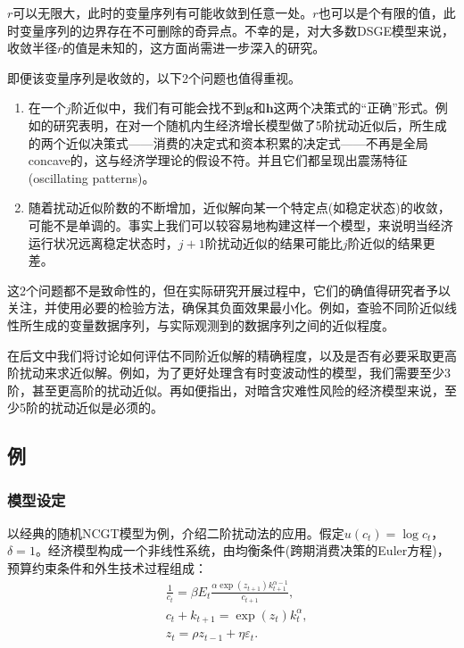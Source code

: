 $r$可以无限大，此时的变量序列有可能收敛到任意一处。$r$也可以是个有限的值，此时变量序列的边界存在不可删除的奇异点。不幸的是，对大多数DSGE模型来说，收敛半径$r$的值是未知的，这方面尚需进一步深入的研究\citep{Swanson:2006gy, Aldrich:2011wz}。

即便该变量序列是收敛的，以下2个问题也值得重视。
\begin{enumerate}
  \item 在一个$j$阶近似中，我们有可能会找不到$\bm{g}$和$\bm{h}$这两个决策式的``正确''形式。例如\cite{Aruoba:2006cz}的研究表明，在对一个随机内生经济增长模型做了5阶扰动近似后，所生成的两个近似决策式——消费的决定式和资本积累的决定式——不再是全局concave的，这与经济学理论的假设不符。并且它们都呈现出震荡特征(oscillating patterns)。

  \item 随着扰动近似阶数的不断增加，近似解向某一个特定点(如稳定状态)的收敛，可能不是单调的。事实上我们可以较容易地构建这样一个模型，来说明当经济运行状况远离稳定状态时，$j+1$阶扰动近似的结果可能比$j$阶近似的结果更差。
\end{enumerate}

这2个问题都不是致命性的，但在实际研究开展过程中，它们的确值得研究者予以关注，并使用必要的检验方法，确保其负面效果最小化。例如，查验不同阶近似线性所生成的变量数据序列，与实际观测到的数据序列之间的近似程度。

在后文中我们将讨论如何评估不同阶近似解的精确程度，以及是否有必要采取更高阶扰动来求近似解。例如，为了更好处理含有时变波动性的模型，我们需要至少3阶，甚至更高阶的扰动近似。再如\cite{Levintal:2017dm}便指出，对暗含灾难性风险的经济模型来说，至少5阶的扰动近似是必须的。

\subsection{例}
\label{sec:pta-example-ncgt}
\subsubsection{模型设定}
以经典的随机NCGT模型为例，介绍二阶扰动法的应用。假定$u(c_t)=\log c_t$，$\delta = 1$。经济模型构成一个非线性系统，由均衡条件(跨期消费决策的Euler方程)，预算约束条件和外生技术过程组成：
\begin{equation*}
  \begin{split}
    &\frac{1}{c_t} = \beta E_t \frac{\alpha \exp(z_{t+1}) k_{t+1}^{\alpha - 1}}{c_{t+1}}, \\
    &c_t + k_{t+1} = \exp(z_t) k_t^{\alpha}, \\
    &z_t = \rho z_{t-1} + \eta \varepsilon_t.
  \end{split}
\end{equation*}


